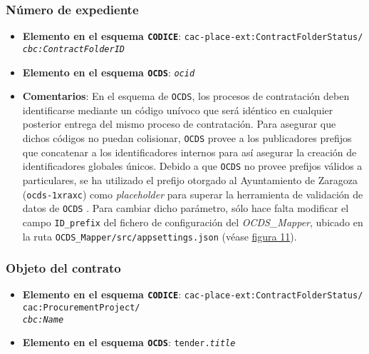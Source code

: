         \subsubsection{Número de expediente} \label{subsubsec:expediente}
            \begin{itemize}
                \item \textbf{Elemento en el esquema \texttt{CODICE}}:
                    \tabto{7.6cm} \texttt{cac-place-ext:ContractFolderStatus/} \\
                    \tabto{7.6cm} \texttt{\textit{cbc:ContractFolderID}}
                \item \textbf{Elemento en el esquema \texttt{OCDS}}:
                    \tabto{7.6cm} \texttt{\textit{ocid}}
                \item \textbf{Comentarios}: En el esquema de \texttt{OCDS}, los procesos de contratación deben identificarse mediante un código unívoco que será idéntico en cualquier posterior entrega del mismo proceso de contratación. Para asegurar que dichos códigos no puedan colisionar, \texttt{OCDS} provee a los publicadores prefijos que concatenar a los identificadores internos para así asegurar la creación de identificadores globales únicos. Debido a que \texttt{OCDS} no provee prefijos válidos a particulares, se ha utilizado el prefijo otorgado al Ayuntamiento de Zaragoza (\texttt{ocds-1xraxc}) como \textit{placeholder} para superar la herramienta de validación de datos de \texttt{OCDS} \cite{OCDSREVIEWTOOL}. Para cambiar dicho parámetro, sólo hace falta modificar el campo \texttt{ID\_prefix} del fichero de configuración del \textit{OCDS\_Mapper}, ubicado en la ruta \texttt{OCDS\_Mapper/src/appsettings.json} (véase \hyperref[fig:estructura]{figura 11}).
            \end{itemize}
        
        \subsubsection{Objeto del contrato}
            \begin{itemize}
                \item \textbf{Elemento en el esquema \texttt{CODICE}}:
                    \tabto{7.6cm} \texttt{cac-place-ext:ContractFolderStatus/} \\
                    \tabto{7.6cm} \texttt{cac:ProcurementProject/} \\
                    \tabto{7.6cm} \texttt{\textit{cbc:Name}}
                \item \textbf{Elemento en el esquema \texttt{OCDS}}:
                    \tabto{7.6cm} \texttt{tender.\textit{title}}
            \end{itemize}
        
